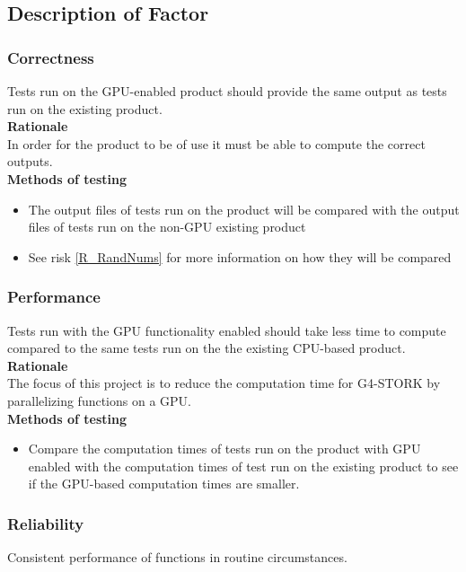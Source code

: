 \documentclass[12pt]{article}
\begin{document}
\subsection{Description of Factor} %
\subsubsection{Correctness}
Tests run on the GPU-enabled product should provide the same output as tests run on the existing product.\\

\textbf{Rationale}\\
In order for the product to be of use it must be able to compute the correct outputs.\\

\textbf{Methods of testing}
\begin{itemize}
\item The output files of tests run on the product will be compared with the output files of tests run on the non-GPU existing product
\item See risk \ref{R_RandNums} for more information on how they will be compared
\end{itemize}

\subsubsection{Performance}
Tests run with the GPU functionality enabled should take less time to compute compared to the same tests run on the the existing CPU-based product.\\

\textbf{Rationale}\\
The focus of this project is to reduce the computation time for G4-STORK by parallelizing functions on a GPU.\\

\textbf{Methods of testing}
\begin{itemize}
\item Compare the computation times of tests run on the product with GPU enabled with the computation times of test run on the existing product to see if the GPU-based computation times are smaller.
\end{itemize}

\subsubsection{Reliability}
Consistent performance of functions in routine circumstances.\\
\end{document}
